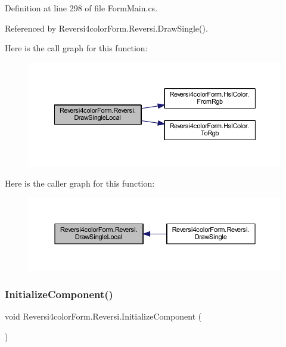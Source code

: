 Definition at line 298 of file Form\+Main.\+cs.



Referenced by Reversi4color\+Form.\+Reversi.\+Draw\+Single().

Here is the call graph for this function\+:
\nopagebreak
\begin{figure}[H]
\begin{center}
\leavevmode
\includegraphics[width=350pt]{class_reversi4color_form_1_1_reversi_a82fb011304d47866a85a9092fe4be6b7_cgraph}
\end{center}
\end{figure}
Here is the caller graph for this function\+:
\nopagebreak
\begin{figure}[H]
\begin{center}
\leavevmode
\includegraphics[width=350pt]{class_reversi4color_form_1_1_reversi_a82fb011304d47866a85a9092fe4be6b7_icgraph}
\end{center}
\end{figure}
\mbox{\label{class_reversi4color_form_1_1_reversi_a9eb7787e255c6aab7c75d6f0730e579e}} 
\subsubsection{\texorpdfstring{Initialize\+Component()}{InitializeComponent()}}
{\footnotesize\ttfamily void Reversi4color\+Form.\+Reversi.\+Initialize\+Component (\begin{DoxyParamCaption}{ }\end{DoxyParamCaption})\hspace{0.3cm}{\ttfamily [private]}}




